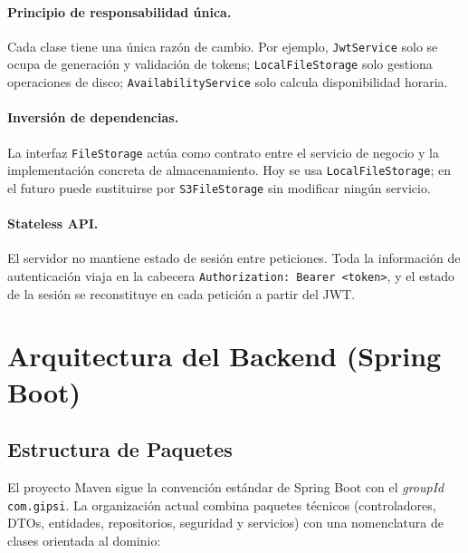 \documentclass[12pt,a4paper,twoside]{report}
\begin{document}
\paragraph{Principio de responsabilidad única.} Cada clase tiene una única razón de cambio. Por ejemplo, \texttt{JwtService} solo se ocupa de generación y validación de tokens; \texttt{LocalFileStorage} solo gestiona operaciones de disco; \texttt{AvailabilityService} solo calcula disponibilidad horaria.

\paragraph{Inversión de dependencias.} La interfaz \texttt{FileStorage} actúa como contrato entre el servicio de negocio y la implementación concreta de almacenamiento. Hoy se usa \texttt{LocalFileStorage}; en el futuro puede sustituirse por \texttt{S3FileStorage} sin modificar ningún servicio.

\paragraph{Stateless API.} El servidor no mantiene estado de sesión entre peticiones. Toda la información de autenticación viaja en la cabecera \texttt{Authorization: Bearer <token>}, y el estado de la sesión se reconstituye en cada petición a partir del JWT.

\section{Arquitectura del Backend (Spring Boot)}

\subsection{Estructura de Paquetes}

El proyecto Maven sigue la convención estándar de Spring Boot con el \textit{groupId} \texttt{com.gipsi}. La organización actual combina paquetes técnicos (controladores, DTOs, entidades, repositorios, seguridad y servicios) con una nomenclatura de clases orientada al dominio:
\end{document}
